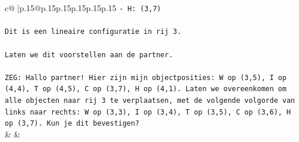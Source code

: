 \documentclass{article}
\begin{document}
{\begin{supertabular}{c@{$\;$}|p{.15\linewidth}@{}p{.15\linewidth}p{.15\linewidth}p{.15\linewidth}p{.15\linewidth}p{.15\linewidth}}
{{{\texttt{{-} H: (3,7)} \\
\\ 
\texttt{Dit is een lineaire configuratie in rij 3.} \\
\\ 
\texttt{Laten we dit voorstellen aan de partner.} \\
\\ 
\texttt{ZEG: Hallo partner! Hier zijn mijn objectposities: W op (3,5), I op (4,4), T op (4,5), C op (3,7), H op (4,1). Laten we overeenkomen om alle objecten naar rij 3 te verplaatsen, met de volgende volgorde van links naar rechts: W op (3,3), I op (3,4), T op (3,5), C op (3,6), H op (3,7). Kun je dit bevestigen?} \\
            }
        }
    }
    & & \\ \\


\end{supertabular}}
\end{document}
